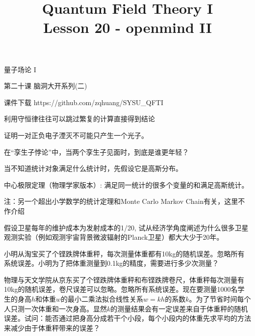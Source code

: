 \documentclass[CJK]{beamer}
\title{Quantum Field Theory I \\ Lesson 20 - openmind II}
\author{}
\date{}
\begin{document}
\begin{frame}
 
\begin{center}
\begin{Large}
\bch
量子场论 I 

{\vskip 0.3in}

第二十课 脑洞大开系列(二)

\ech
\end{Large}
\end{center}

\vskip 0.2in

\bch
课件下载
\ech
https://github.com/zqhuang/SYSU\_QFTI

\end{frame}



\begin{frame}
\bch
利用守恒律往往可以跳过繁复的计算直接得到结论
\ech
\end{frame}

\begin{frame}
\bch
证明一对正负电子湮灭不可能只产生一个光子。
\ech
\end{frame}

\begin{frame}
\bch
在“孪生子悖论”中，当两个孪生子见面时，到底是谁更年轻？
\ech
\end{frame}

\begin{frame}
\bch
当不知道统计对象满足什么统计时，先假设它是高斯分布。
\ech
\end{frame}

\begin{frame}
\bch
中心极限定理（物理学家版本）: 满足同一统计的很多个变量的和满足高斯统计。

\skiplines
{\tiny
注：另一个超出小学数学的统计定理和Monte Carlo Markov Chain有关，这里不作介绍}
\ech
\end{frame}

\begin{frame}
\bch
假设卫星每年的维护成本为发射成本的1/20, 试从经济学角度阐述为什么很多卫星观测实验（例如观测宇宙背景微波辐射的Planck卫星）都大大少于20年。
\ech
\end{frame}

\begin{frame}
\bch
小明从淘宝买了个铿跌牌体重秤，每次测量体重都有10kg的随机误差。忽略所有系统误差。小明为了把体重测量到0.1kg的精度，需要进行多少次测量？
\ech
\end{frame}


\begin{frame}
\bch
物理与天文学院从京东买了个铿跌牌体重秤和布铿跌牌卷尺，体重秤每次测量有10kg的随机误差，卷尺误差可以忽略。忽略所有系统误差。现在要测量1000名学生的身高$h$和体重$w$的最小二乘法拟合线性关系$w = k h$的系数$k$。为了节省时间每个人只测一次体重和一次身高。显然$k$的测量结果会有一定误差来自于体重秤的随机误差。试问：能否通过把身高分成若干个小段，每个小段内的体重先求平均的方法来减少由于体重秤带来的误差？
\ech
\end{frame}
\end{document}
